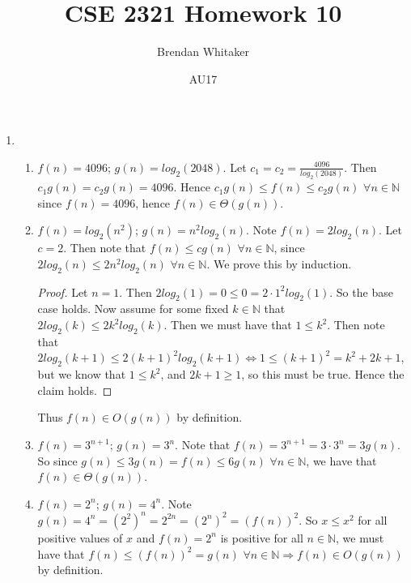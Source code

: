 \documentclass[10pt,oneside,reqno]{amsart}
\theoremstyle{plain}
\theoremstyle{definition}
\begin{document}
\title{CSE 2321 Homework 10}

\date{AU17}

\author[Brendan Whitaker]{Brendan Whitaker}

\maketitle

\begin{enumerate}[label=\arabic*.]

\item 

\begin{enumerate}

\item $f(n) = 4096$; $g(n) = log_2(2048)$. Let $c_1 = c_2 = \frac{4096}{log_2(2048)}$. Then $c_1g(n) = c_2g(n) = 4096$. Hence $c_1g(n) \leq f(n) \leq c_2g(n)$ $\forall n \in \mathbb{N}$ since $f(n) = 4096$, hence $f(n) \in \Theta(g(n))$. \\

\item $f(n) = log_2(n^2)$; $g(n) = n^2log_2(n)$. Note $f(n) = 2log_2(n)$. Let $c = 2$. Then note that $f(n) \leq cg(n)$ $\forall n \in \mathbb{N}$, since $2log_2(n) \leq 2n^2log_2(n)$ $ \forall n \in \mathbb{N}$. We prove this by induction. \\

\begin{proof}
Let $n = 1$. Then $2log_2(1) = 0 \leq 0 = 2\cdot1^2log_2(1)$. So the base case holds. Now assume for some fixed $k \in \mathbb{N}$ that $2log_2(k) \leq 2k^2log_2(k)$. Then we must have that $1 \leq k^2$. Then note that $2log_2(k + 1) \leq 2(k + 1)^2log_2(k + 1) \Leftrightarrow 1 \leq (k + 1)^2 = k^2 + 2k + 1$, but we know that $1 \leq k^2$, and $2k + 1 \geq 1$, so this must be true. Hence the claim holds.  
\end{proof}
Thus $f(n) \in O(g(n))$ by definition. \\
\item $f(n) = 3^{n  +1}$; $g(n) = 3^n$. Note that $f(n) = 3^{n  +1} = 3\cdot 3^n = 3g(n)$. So since $g(n) \leq 3g(n) = f(n) \leq 6g(n)$ $\forall n \in \mathbb{N}$, we have that $f(n) \in \Theta(g(n))$. \\
\item $f(n) = 2^n$; $g(n) = 4^n$. Note $g(n) = 4^n = (2^2)^n = 2^{2n} = (2^n)^2 = (f(n))^2$. So $x \leq x^2$ for all positive values of $x$ and $f(n) = 2^n$ is positive for all $n \in \mathbb{N}$, we must have that $f(n) \leq (f(n))^2  = g(n)$ $\forall n \in \mathbb{N} \Rightarrow f(n) \in O(g(n))$ by definition. \\


\end{enumerate}
\end{enumerate}
\end{document}

